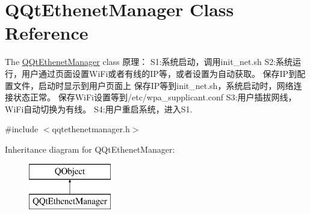 \hypertarget{class_q_qt_ethenet_manager}{}\section{Q\+Qt\+Ethenet\+Manager Class Reference}
\label{class_q_qt_ethenet_manager}


The \mbox{\hyperlink{class_q_qt_ethenet_manager}{Q\+Qt\+Ethenet\+Manager}} class 原理： S1\+:系统启动，调用init\+\_\+net.\+sh S2\+:系统运行，用户通过页面设置\+Wi\+Fi或者有线的\+I\+P等，或者设置为自动获取。 保存\+I\+P到配置文件，启动时显示到用户页面上 保存\+I\+P等到init\+\_\+net.\+sh，系统启动时，网络连接状态正常。 保存\+Wi\+Fi设置等到/etc/wpa\+\_\+supplicant.conf S3\+:用户插拔网线，\+Wi\+Fi自动切换为有线。 S4\+:用户重启系统，进入\+S1.  




{\ttfamily \#include $<$qqtethenetmanager.\+h$>$}

Inheritance diagram for Q\+Qt\+Ethenet\+Manager\+:\begin{figure}[H]
\begin{center}
\leavevmode
\includegraphics[height=2.000000cm]{class_q_qt_ethenet_manager}
\end{center}
\end{figure}
